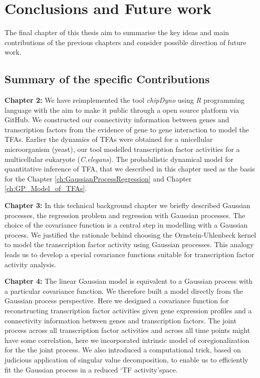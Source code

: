 
\chapter{Conclusions and Future work}

\ifpdf
    \graphicspath{{Chapter6/Figs/Raster/}{Chapter6/Figs/PDF/}{Chapter6/Figs/}}
\else
    \graphicspath{{Chapter6/Figs/Vector/}{Chapter6/Figs/}}
\fi

The final chapter of this thesis aim to summarise the key ideas and main contributions of the previous chapters and consider possible direction of  future work.

\section{Summary of the specific Contributions}
\textbf{Chapter 2:} We have reimplemented the tool \emph{chipDyno} using \emph{R} programming language with the aim to make it public through a open source platform via GitHub. We constructed our connectivity information between genes and transcription factors from the evidence of gene to gene interaction to model the TFAs. Earlier the dynamics of TFAs were obtained for a unicellular microorganism (yeast), our tool modelled transcription factor activities for a multicellular eukaryote (\textit{C.elegans}). The probabilistic dynamical model for quantitative inference of TFA, that we described in this chapter used as the basis for the  Chapter \ref{ch:GaussianProcessRegression} and Chapter \ref{ch:GP_Model_of_TFAs}.

\textbf{Chapter 3:} In this technical background chapter we briefly described Gaussian processes, the regression problem and regression with Gaussian processes. The choice of the covariance function is a central step in modelling with a Gaussian process. We justified the rationale behind choosing the Ornstein-Uhlenbeck kernel to model the transcription factor activity using Gaussian processes. This analogy leads us to develop a special covariance functions suitable for transcription factor activity analysis. 

\textbf{Chapter 4:} The linear Gaussian model is equivalent to a Gaussian process with a particular covariance function. We therefore built a model directly from the Gaussian process perspective. Here we designed a covariance function for reconstructing transcription factor activities given gene expression profiles and a connectivity information between genes and transcription factors. The joint process across all transcription factor activities and across all time points might have some correlation, here we incorporated intrinsic model of coregionalization for the the joint process. We also introduced a computational trick, based on  judicious application of singular value decomposition, to enable us to efficiently fit the Gaussian process in a reduced \lq TF activity\rq space. 


